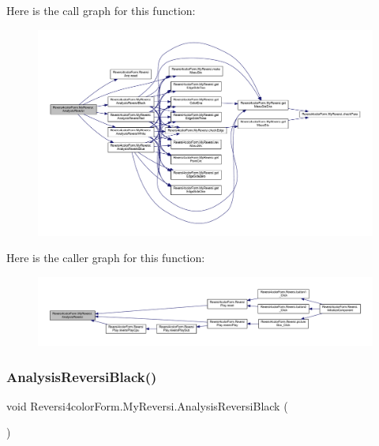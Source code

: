 Here is the call graph for this function\+:
\nopagebreak
\begin{figure}[H]
\begin{center}
\leavevmode
\includegraphics[width=350pt]{class_reversi4color_form_1_1_my_reversi_ade9840e10e80b3e908a406efe9ee1372_cgraph}
\end{center}
\end{figure}
Here is the caller graph for this function\+:
\nopagebreak
\begin{figure}[H]
\begin{center}
\leavevmode
\includegraphics[width=350pt]{class_reversi4color_form_1_1_my_reversi_ade9840e10e80b3e908a406efe9ee1372_icgraph}
\end{center}
\end{figure}
\mbox{\label{class_reversi4color_form_1_1_my_reversi_ae4c0b7e9a3cedba827facf1d96b654f0}} 
\subsubsection{\texorpdfstring{Analysis\+Reversi\+Black()}{AnalysisReversiBlack()}}
{\footnotesize\ttfamily void Reversi4color\+Form.\+My\+Reversi.\+Analysis\+Reversi\+Black (\begin{DoxyParamCaption}{ }\end{DoxyParamCaption})\hspace{0.3cm}{\ttfamily [private]}}



